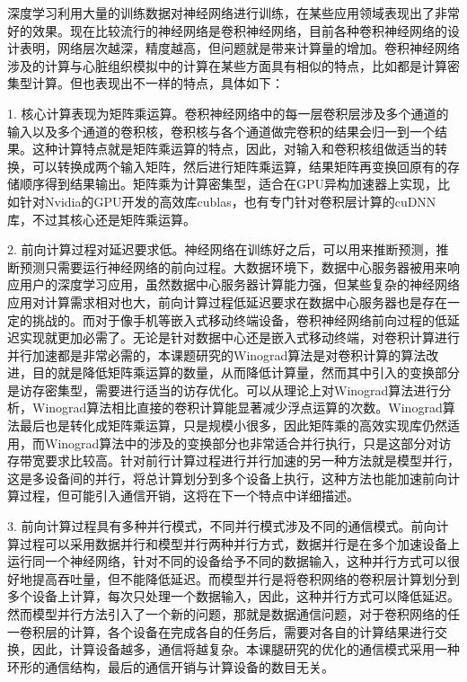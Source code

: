 深度学习利用大量的训练数据对神经网络进行训练，在某些应用领域表现出了非常好的效果。现在比较流行的神经网络是卷积神经网络，目前各种卷积神经网络的设计表明，网络层次越深，精度越高，但问题就是带来计算量的增加。卷积神经网络涉及的计算与心脏组织模拟中的计算在某些方面具有相似的特点，比如都是计算密集型计算。但也表现出不一样的特点，具体如下：
\begin{compactitem}
\item[1.]核心计算表现为矩阵乘运算。卷积神经网络中的每一层卷积层涉及多个通道的输入以及多个通道的卷积核，卷积核与各个通道做完卷积的结果会归一到一个结果。这种计算特点就是矩阵乘运算的特点，因此，对输入和卷积核组做适当的转换，可以转换成两个输入矩阵，然后进行矩阵乘运算，结果矩阵再变换回原有的存储顺序得到结果输出。矩阵乘为计算密集型，适合在GPU异构加速器上实现，比如针对Nvidia的GPU开发的高效库cublas，也有专门针对卷积层计算的cuDNN库，不过其核心还是矩阵乘运算。

\item[2.]前向计算过程对延迟要求低。神经网络在训练好之后，可以用来推断预测，推断预测只需要运行神经网络的前向过程。大数据环境下，数据中心服务器被用来响应用户的深度学习应用，虽然数据中心服务器计算能力强，但某些复杂的神经网络应用对计算需求相对也大，前向计算过程低延迟要求在数据中心服务器也是存在一定的挑战的。而对于像手机等嵌入式移动终端设备，卷积神经网络前向过程的低延迟实现就更加必需了。无论是针对数据中心还是嵌入式移动终端，对卷积计算进行并行加速都是非常必需的，本课题研究的Winograd算法是对卷积计算的算法改进，目的就是降低矩阵乘运算的数量，从而降低计算量，然而其中引入的变换部分是访存密集型，需要进行适当的访存优化。可以从理论上对Winograd算法进行分析，Winograd算法相比直接的卷积计算能显著减少浮点运算的次数。Winograd算法最后也是转化成矩阵乘运算，只是规模小很多，因此矩阵乘的高效实现库仍然适用，而Winograd算法中的涉及的变换部分也非常适合并行执行，只是这部分对访存带宽要求比较高。针对前行计算过程进行并行加速的另一种方法就是模型并行，这是多设备间的并行，将总计算划分到多个设备上执行，这种方法也能加速前向计算过程，但可能引入通信开销，这将在下一个特点中详细描述。

\item[3.]前向计算过程具有多种并行模式，不同并行模式涉及不同的通信模式。前向计算过程可以采用数据并行和模型并行两种并行方式，数据并行是在多个加速设备上运行同一个神经网络，针对不同的设备给予不同的数据输入，这种并行方式可以很好地提高吞吐量，但不能降低延迟。而模型并行是将卷积网络的卷积层计算划分到多个设备上计算，每次只处理一个数据输入，因此，这种并行方式可以降低延迟。然而模型并行方法引入了一个新的问题，那就是数据通信问题，对于卷积网络的任一卷积层的计算，各个设备在完成各自的任务后，需要对各自的计算结果进行交换，因此，计算设备越多，通信将越复杂。本课腿研究的优化的通信模式采用一种环形的通信结构，最后的通信开销与计算设备的数目无关。


\end{compactitem}
